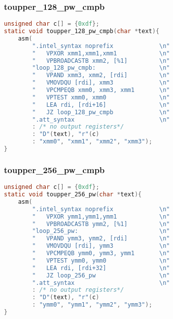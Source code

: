 \documentclass{beamer}
\begin{document}
\begin{frame}[fragile]
  \frametitle{toupper\_128\_pw\_cmpb}
  
\begin{lstlisting}[language=c,style=customc]
unsigned char c[] = {0xdf};
static void toupper_128_pw_cmpb(char *text){
    asm(
        ".intel_syntax noprefix             \n" 
        "   VPXOR xmm1,xmm1,xmm1            \n"
        "   VPBROADCASTB xmm2, [%1]         \n"
        "loop_128_pw_cmpb:                  \n"
        "   VPAND xmm3, xmm2, [rdi]         \n"
        "   VMOVDQU [rdi], xmm3             \n"
        "   VPCMPEQB xmm0, xmm3, xmm1       \n"
        "   VPTEST xmm0, xmm0               \n"
        "   LEA rdi, [rdi+16]               \n"
        "   JZ loop_128_pw_cmpb             \n"
        ".att_syntax                        \n"
        : /* no output registers*/
        : "D"(text), "r"(c)
        : "xmm0", "xmm1", "xmm2", "xmm3");
}
\end{lstlisting}
  
\end{frame}



\begin{frame}[fragile]
  \frametitle{toupper\_256\_pw\_cmpb}
  
\begin{lstlisting}[language=c,style=customc]
unsigned char c[] = {0xdf};
static void toupper_256_pw(char *text){
    asm(
        ".intel_syntax noprefix             \n"
        "   VPXOR ymm1,ymm1,ymm1            \n"
        "   VPBROADCASTB ymm2, [%1]         \n"
        "loop_256_pw:                       \n"
        "   VPAND ymm3, ymm2, [rdi]         \n"
        "   VMOVDQU [rdi], ymm3             \n"
        "   VPCMPEQB ymm0, ymm3, ymm1       \n"
        "   VPTEST ymm0, ymm0               \n"
        "   LEA rdi, [rdi+32]               \n"
        "   JZ loop_256_pw                  \n"
        ".att_syntax                        \n"
        : /* no output registers*/
        : "D"(text), "r"(c)
        : "ymm0", "ymm1", "ymm2", "ymm3");
}
\end{lstlisting}
  
\end{frame}
\end{document}
